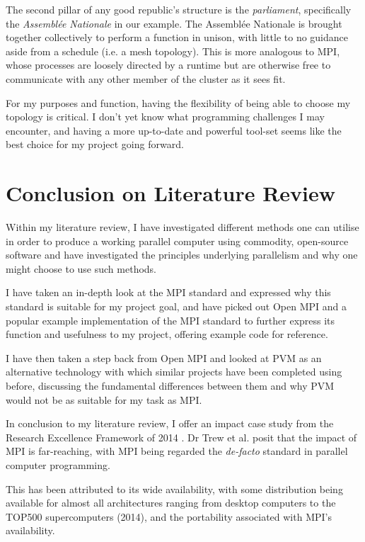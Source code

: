 The second pillar of any good republic's structure is the \emph{parliament}, specifically the \emph{Assemblée Nationale} in our example. The Assemblée Nationale is brought together collectively to perform a function in unison, with little to no guidance aside from a schedule (i.e. a mesh topology). This is more analogous to MPI, whose processes are loosely directed by a runtime but are otherwise free to communicate with any other member of the cluster as it sees fit.

For my purposes and function, having the flexibility of being able to choose my topology is critical. I don't yet know what programming challenges I may encounter, and having a more up-to-date and powerful tool-set seems like the best choice for my project going forward.

\section{Conclusion on Literature Review}
Within my literature review, I have investigated different methods one can utilise in order to produce a working parallel computer using commodity, open-source software and have investigated the principles underlying parallelism and why one might choose to use such methods. 

I have taken an in-depth look at the MPI standard and expressed why this standard is suitable for my project goal, and have picked out Open MPI and a popular example implementation of the MPI standard to further express its function and usefulness to my project, offering example code for reference.

I have then taken a step back from Open MPI and looked at PVM as an alternative technology with which similar projects have been completed using before, discussing the fundamental differences between them and why PVM would not be as suitable for my task as MPI.

In conclusion to my literature review, I offer an impact case study from the Research Excellence Framework of 2014 \cite{trew_et_al_2014}. Dr Trew et al. posit that the impact of MPI is far-reaching, with MPI being regarded the \emph{de-facto} standard in parallel computer programming.

This has been attributed to its wide availability, with some distribution being available for almost all architectures ranging from desktop computers to the TOP500 supercomputers (2014), and the portability associated with MPI's availability.

